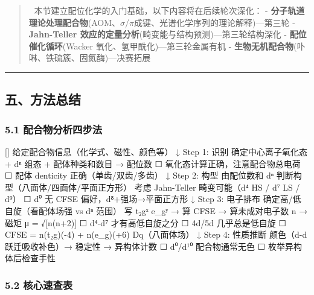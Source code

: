 \documentclass[a4paper,11pt]{ctexart}
\newenvironment{Shaded}{}{}
\newenvironment{Highlighting}{}{}
\newcommand{\NormalTok}[1]{#1}
\newcommand{\箭}{\ensuremath{\rightarrow}}
\newcommand{\左箭}{\ensuremath{\leftarrow}}
\newcommand{\上箭}{\ensuremath{\uparrow}}
\newcommand{\下箭}{\ensuremath{\downarrow}}
\newcommand{\衡}{\ensuremath{\rightleftharpoons}}
\newcommand{\双箭}{\ensuremath{\leftrightarrow}}
\newcommand{\约等于}{\ensuremath{\approx}}
\newcommand{\小于等于}{\ensuremath{\leq}}
\newcommand{\大于等于}{\ensuremath{\geq}}
\newcommand{\不等于}{\ensuremath{\neq}}
\newcommand{\西格马}{\ensuremath{\sigma}}
\newcommand{\派}{\ensuremath{\pi}}
\begin{document}
\begin{quote}
🔷 本节建立配位化学的入门基础，以下内容将在后续轮次深化：
- \textbf{分子轨道理论处理配合物}(AOM、\西格马/\派 成键、光谱化学序列的理论解释)---第三轮
- \textbf{Jahn-Teller 效应的定量分析}(畸变能与结构预测)---第三轮结构深化
- \textbf{配位催化循环}(Wacker 氧化、氢甲酰化)---第三轮金属有机
- \textbf{生物无机配合物}(卟啉、铁硫簇、固氮酶)---决赛拓展
\end{quote}

\begin{center}\rule{0.5\linewidth}{0.5pt}\end{center}

\subsection{五、方法总结}\label{ux4e94ux65b9ux6cd5ux603bux7ed3}

\subsubsection{5.1 配合物分析四步法}\label{ux914dux5408ux7269ux5206ux6790ux56dbux6b65ux6cd5}

\begin{Shaded}
\begin{Highlighting}[]
\NormalTok{给定配合物信息（化学式、磁性、颜色等）}
\NormalTok{ ↓}
\NormalTok{Step 1: 识别}
\NormalTok{ 确定中心离子氧化态 + dⁿ 组态 + 配体种类和数目 → 配位数}
\NormalTok{ ☐ 氧化态计算正确，注意配合物总电荷}
\NormalTok{ ☐ 配体 denticity 正确（单齿/双齿/多齿）}
\NormalTok{ ↓}
\NormalTok{Step 2: 构型}
\NormalTok{ 由配位数和 dⁿ 判断构型（八面体/四面体/平面正方形）}
\NormalTok{ 考虑 Jahn{-}Teller 畸变可能（d⁴ HS / d⁷ LS / d⁹）}
\NormalTok{ ☐ d⁰ 无 CFSE 偏好，d⁸+强场→平面正方形}
\NormalTok{ ↓}
\NormalTok{Step 3: 电子排布}
\NormalTok{ 确定高/低自旋（看配体场强 vs dⁿ 范围）}
\NormalTok{ 写 t₂gˣ e\_gʸ → 算 CFSE → 算未成对电子数 n → 磁矩 μ = √[n(n+2)]}
\NormalTok{ ☐ d⁴{-}d⁷ 才有高低自旋之分}
\NormalTok{ ☐ 4d/5d 几乎总是低自旋}
\NormalTok{ ☐ CFSE = n(t₂g)({-}4) + n(e\_g)(+6) Dq（八面体场）}
\NormalTok{ ↓}
\NormalTok{Step 4: 性质推断}
\NormalTok{ 颜色（d{-}d 跃迁吸收补色）→ 稳定性 → 异构体计数}
\NormalTok{ ☐ d⁰/d¹⁰ 配合物通常无色}
\NormalTok{ ☐ 枚举异构体后检查手性}
\end{Highlighting}
\end{Shaded}

\subsubsection{5.2 核心速查表}\label{ux6838ux5fc3ux901fux67e5ux8868}
\end{document}
